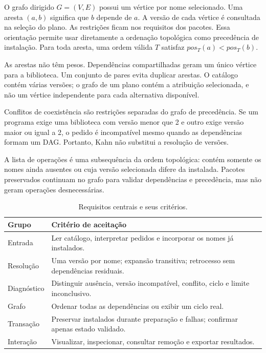 \documentclass[12pt]{article}
\begin{document}
O grafo dirigido $G=(V,E)$ possui um vértice por nome selecionado. Uma aresta $(a,b)$ significa que $b$ depende de $a$. A versão de cada vértice é consultada na seleção do plano. As restrições ficam nos requisitos dos pacotes. Essa orientação permite usar diretamente a ordenação topológica como precedência de instalação. Para toda aresta, uma ordem válida $T$ satisfaz $pos_T(a)<pos_T(b)$.

As arestas não têm pesos. Dependências compartilhadas geram um único vértice para a biblioteca. Um conjunto de pares evita duplicar arestas. O catálogo contém várias versões; o grafo de um plano contém a atribuição selecionada, e não um vértice independente para cada alternativa disponível.

Conflitos de coexistência são restrições separadas do grafo de precedência. Se um programa exige uma biblioteca com versão menor que 2 e outro exige versão maior ou igual a 2, o pedido é incompatível mesmo quando as dependências formam um DAG. Portanto, Kahn não substitui a resolução de versões.

A lista de operações é uma subsequência da ordem topológica: contém somente os nomes ainda ausentes ou cuja versão selecionada difere da instalada. Pacotes preservados continuam no grafo para validar dependências e precedência, mas não geram operações desnecessárias.

\begin{table}[ht]\centering\small
\begin{tabular}{p{.2\linewidth}p{.72\linewidth}}\toprule
Grupo & Critério de aceitação\\\midrule
Entrada & Ler catálogo, interpretar pedidos e incorporar os nomes já instalados.\\
Resolução & Uma versão por nome; expansão transitiva; retrocesso sem dependências residuais.\\
Diagnóstico & Distinguir ausência, versão incompatível, conflito, ciclo e limite inconclusivo.\\
Grafo & Ordenar todas as dependências ou exibir um ciclo real.\\
Transação & Preservar instalados durante preparação e falhas; confirmar apenas estado validado.\\
Interação & Visualizar, inspecionar, consultar remoção e exportar resultados.\\\bottomrule
\end{tabular}\caption{Requisitos centrais e seus critérios.}\end{table}
\end{document}
